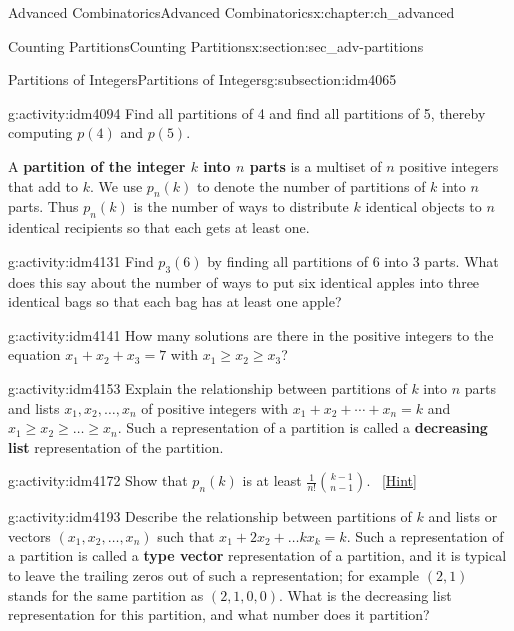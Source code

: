 \documentclass[oneside,10pt,]{book}
\newcommand{\terminology}[1]{\textbf{#1}}
\numberwithin{equation}{chapter}
\begin{document}
\begin{chapterptx}{Advanced Combinatorics}{}{Advanced Combinatorics}{}{}{x:chapter:ch_advanced}
\begin{sectionptx}{Counting Partitions}{}{Counting Partitions}{}{}{x:section:sec_adv-partitions}
\begin{subsectionptx}{Partitions of Integers}{}{Partitions of Integers}{}{}{g:subsection:idm4065}
\begin{activity}{}{g:activity:idm4094}%
Find all partitions of 4 and find all partitions of 5, thereby computing \(p(4)\) and \(p(5)\).%
\end{activity}
A \terminology{partition of the integer \(k\) into \(n\) parts} is a multiset of \(n\) positive integers that add to \(k\). We use \(p_n(k)\) to denote the number of partitions of \(k\) into \(n\) parts. Thus \(p_n(k)\) is the number of ways to distribute \(k\) identical objects to \(n\) identical recipients so that each gets at least one.%
\begin{activity}{}{g:activity:idm4131}%
Find \(p_3(6)\) by finding all partitions of 6 into 3 parts. What does this say about the number of ways to put six identical apples into three identical bags so that each bag has at least one apple?%
\end{activity}
\begin{activity}{}{g:activity:idm4141}%
How many solutions are there in the positive integers to the equation \(x_1+x_2+x_3 =7\) with \(x_1\ge x_2\ge x_3\)?%
\end{activity}
\begin{activity}{}{g:activity:idm4153}%
Explain the relationship between partitions of \(k\) into \(n\) parts and lists \(x_1,x_2,\ldots,x_n\) of positive integers with \(x_1 + x_2 + \cdots + x_n = k\) and \(x_1\ge x_2\ge\ldots \ge x_n\). Such a representation of a partition is called a \terminology{decreasing list} representation of the partition.%
\end{activity}
\begin{activity}{}{g:activity:idm4172}%
Show that \(p_n(k)\) is at least \(\frac{1}{n!}\binom{k-1}{n-1}\).%
\qquad~\hfill{\tiny\hyperlink{g:hint:idm4177-back}{[Hint]}}\end{activity}
\begin{activity}{}{g:activity:idm4193}%
Describe the relationship between partitions of \(k\) and lists or vectors \((x_1,x_2,\ldots,x_n)\) such that \(x_1+2x_2+\ldots kx_k = k\).  Such a representation of a partition is called a \terminology{type vector} representation of a partition, and it is typical to leave the trailing zeros out of such a representation; for example \((2,1)\) stands for the same partition as \((2,1,0,0)\). What is the decreasing list representation for this partition, and what number does it partition?%

\end{activity}
\end{subsectionptx}
\end{sectionptx}
\end{chapterptx}
\end{document}
